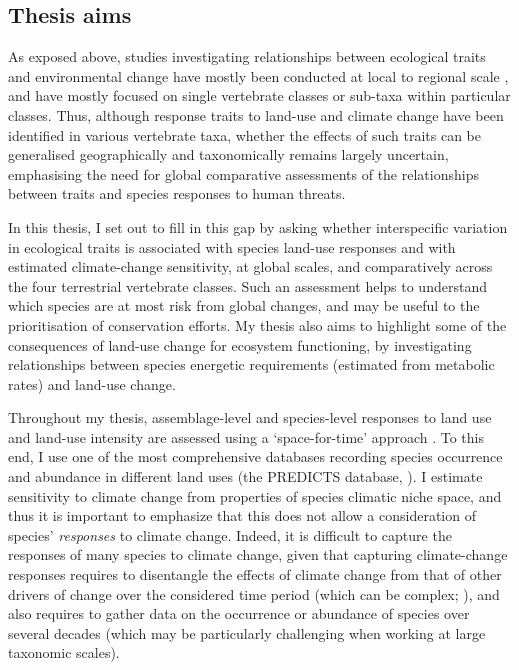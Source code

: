 \subsection{Thesis aims}

As exposed above, studies investigating relationships between ecological traits and environmental change have mostly been conducted at local to regional scale \citep{Hevia2017, Davison2021}, and have mostly focused on single vertebrate classes or sub-taxa within particular classes. Thus, although response traits to land-use and climate change have been identified in various vertebrate taxa, whether the effects of such traits can be generalised geographically and taxonomically remains largely uncertain, emphasising the need for global comparative assessments of the relationships between traits and species responses to human threats. 
 
In this thesis, I set out to fill in this gap by asking whether interspecific variation in ecological traits is associated with species land-use responses and with estimated climate-change sensitivity, at global scales, and comparatively across the four terrestrial vertebrate classes. Such an assessment helps to understand which species are at most risk from global changes, and may be useful to the prioritisation of conservation efforts. My thesis also aims to highlight some of the consequences of land-use change for ecosystem functioning, by investigating relationships between species energetic requirements (estimated from metabolic rates) and land-use change.

Throughout my thesis, assemblage-level and species-level responses to land use and land-use intensity are assessed using a `space-for-time' approach \citep{DePalma2018}. To this end, I use one of the most comprehensive databases recording species occurrence and abundance in different land uses (the PREDICTS database, \citet{Hudson2014, Hudson2017}). I estimate sensitivity to climate change from properties of species climatic niche space, and thus it is important to emphasize that this does not allow a consideration of species’ \textit{responses} to climate change. Indeed, it is difficult to capture the responses of many species to climate change, given that capturing climate-change responses requires to disentangle the effects of climate change from that of other drivers of change over the considered time period (which can be complex; \citep{MacLean2017}), and also requires to gather data on the occurrence or abundance of species over several decades (which may be particularly challenging when working at large taxonomic scales). 


